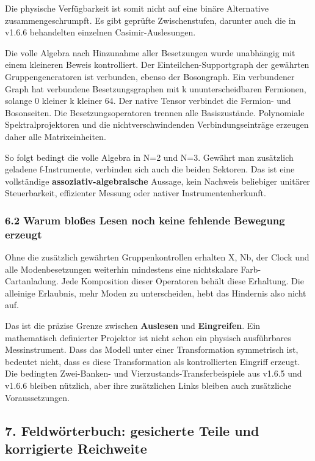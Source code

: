 Die physische Verfügbarkeit ist somit nicht auf eine binäre Alternative
zusammengeschrumpft. Es gibt geprüfte Zwischenstufen, darunter auch die
in v1.6.6 behandelten einzelnen Casimir-Auslesungen.

Die volle Algebra nach Hinzunahme aller Besetzungen wurde unabhängig mit
einem kleineren Beweis kontrolliert. Der Einteilchen-Supportgraph der
gewährten Gruppengeneratoren ist verbunden, ebenso der Bosongraph. Ein
verbundener Graph hat verbundene Besetzungsgraphen mit k
ununterscheidbaren Fermionen, solange 0 kleiner k kleiner 64. Der native
Tensor verbindet die Fermion- und Bosonseiten. Die Besetzungsoperatoren
trennen alle Basiszustände. Polynomiale Spektralprojektoren und die
nichtverschwindenden Verbindungseinträge erzeugen daher alle
Matrixeinheiten.

So folgt bedingt die volle Algebra in N=2 und N=3. Gewährt man
zusätzlich geladene f-Instrumente, verbinden sich auch die beiden
Sektoren. Das ist eine vollständige \textbf{assoziativ-algebraische}
Aussage, kein Nachweis beliebiger unitärer Steuerbarkeit, effizienter
Messung oder nativer Instrumentenherkunft.

\subsubsection{6.2 Warum bloßes Lesen noch keine fehlende Bewegung
erzeugt}\label{warum-blouxdfes-lesen-noch-keine-fehlende-bewegung-erzeugt}

Ohne die zusätzlich gewährten Gruppenkontrollen erhalten X, Nb, der
Clock und alle Modenbesetzungen weiterhin mindestens eine nichtskalare
Farb-Cartanladung. Jede Komposition dieser Operatoren behält diese
Erhaltung. Die alleinige Erlaubnis, mehr Moden zu unterscheiden, hebt
das Hindernis also nicht auf.

Das ist die präzise Grenze zwischen \textbf{Auslesen} und
\textbf{Eingreifen}. Ein mathematisch definierter Projektor ist nicht
schon ein physisch ausführbares Messinstrument. Dass das Modell unter
einer Transformation symmetrisch ist, bedeutet nicht, dass es diese
Transformation als kontrollierten Eingriff erzeugt. Die bedingten
Zwei-Banken- und Vierzustands-Transferbeispiele aus v1.6.5 und v1.6.6
bleiben nützlich, aber ihre zusätzlichen Links bleiben auch zusätzliche
Voraussetzungen.

\subsection{7. Feldwörterbuch: gesicherte Teile und korrigierte
Reichweite}\label{feldwuxf6rterbuch-gesicherte-teile-und-korrigierte-reichweite}

